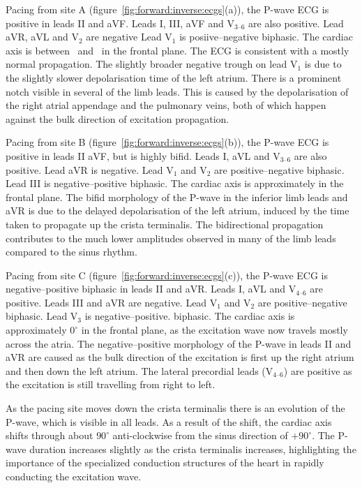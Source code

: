 Pacing from site A (figure~\ref{fig:forward:inverse:ecgs}(a)), the P-wave ECG is
positive in leads II and  aVF.
Leads I, III,  aVF and $\text{V}_{\text{3--6}}$ are also positive.
Lead aVR, aVL and $\text{V}_{\text{2}}$ are negative
Lead $\text{V}_{\text{1}}$ is posiive--negative biphasic.
The cardiac axis is between \ and \ in the frontal plane.
The ECG is consistent with a mostly normal propagation.
The slightly broader negative trough on lead $\text{V}_{\text{1}}$ is due to the
slightly slower depolarisation time of the left atrium.
There is a prominent notch visible in several of the limb leads.
This is caused by the depolarisation of the right atrial appendage and the
pulmonary veins, both of which happen against the bulk direction of excitation
propagation.

Pacing from site B (figure~\ref{fig:forward:inverse:ecgs}(b)), the P-wave ECG
is positive in leads II aVF, but is highly bifid.
Leads I, aVL and $\text{V}_{\text{3--6}}$ are also positive.
Lead aVR is negative.
Lead $\text{V}_{\text{1}}$ and $\text{V}_{\text{2}}$ are positive--negative
biphasic.
Lead III is negative--positive biphasic.
The cardiac axis is approximately  in the frontal plane.
The bifid morphology of the P-wave in the inferior limb leads and aVR is due to
the delayed depolarisation of the left atrium, induced by the time taken to
propagate up the crista terminalis.
The bidirectional propagation contributes to the much lower amplitudes observed
in many of the limb leads compared to the sinus rhythm.


Pacing from site C (figure~\ref{fig:forward:inverse:ecgs}(c)), the P-wave ECG is
negative--positive biphasic in leads II and aVR.
Leads I, aVL and $\text{V}_{\text{4--6}}$ are positive.
Leads III and aVR are negative.
Lead $\text{V}_{\text{1}}$ and $\text{V}_{\text{2}}$ are positive--negative
biphasic.
Lead $\text{V}_{\text{3}}$ is negative--positive.
biphasic.
The cardiac axis is approximately $0^\circ$ in the frontal plane, as the
excitation wave now travels mostly across the atria.
The negative--positive morphology of the P-wave in leads II and aVR are caused
as the bulk direction of the excitation is first up the right atrium and then
down the left atrium.
The lateral precordial leads ($\text{V}_{\text{4--6}}$) are positive as the
excitation is still travelling from right to left.

As the pacing site moves down the crista terminalis there is an evolution of the
P-wave, which is visible in all leads.
As a result of the shift, the cardiac axis shifts through about $90^\circ$
anti-clockwise from the sinus direction of $+90^\circ$.
The P-wave duration increases slightly as the crista terminalis increases,
highlighting the importance of the specialized conduction structures of the
heart in rapidly conducting the excitation wave.


